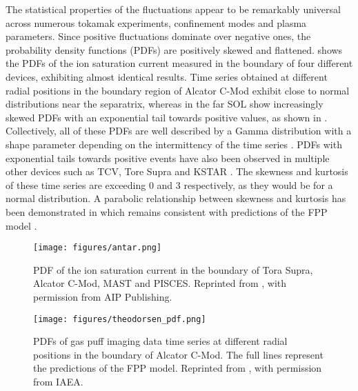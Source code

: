 The statistical properties of the fluctuations appear to be remarkably universal across numerous tokamak experiments, confinement modes and plasma parameters. Since positive fluctuations dominate over negative ones, the probability density functions (PDFs) are positively skewed and flattened.  shows the PDFs of the ion saturation current measured in the boundary of four different devices, exhibiting almost identical results.  Time series obtained at different radial positions in the boundary region of Alcator C-Mod exhibit close to normal distributions near the separatrix, whereas in the far SOL show increasingly skewed PDFs with an exponential tail towards positive values, as shown in . Collectively, all of these PDFs are well described by a Gamma distribution with a shape parameter depending on the intermittency of the time series \cite{theodorsen2017relationship}. PDFs with exponential tails towards positive events have also been observed in multiple other devices such as TCV, Tore Supra and KSTAR \cite{antar2001turbulence,antar2003universality,graves2005self,garcia2007fluctuations,garcia2007collisionality,garcia2009blob,garcia2017sol}. The skewness and kurtosis of these time series are exceeding 0 and 3 respectively, as they would be for a normal distribution. A parabolic relationship between skewness and kurtosis has been demonstrated in  \cite{labit2007universal,sattin2009statistics,sattin2009parabolic} which remains consistent with predictions of the FPP model \cite{garcia2016stochastic}.
\begin{figure}
	\centering
	\begin{minipage}{.48\linewidth}
		\texttt{[image: figures/antar.png]}
		\caption{PDF of the ion saturation current in the boundary of Tora Supra, Alcator C-Mod, MAST and PISCES. Reprinted from \cite{antar2003universality}, with permission from AIP Publishing.}
		\label{Fig:antar}
	\end{minipage}
	\hfill
	\begin{minipage}{.48\linewidth}
		\texttt{[image: figures/theodorsen\_pdf.png]}
		\caption{PDFs of gas puff imaging data time series at different radial positions in the boundary of Alcator C-Mod. The full lines represent the predictions of the FPP model. Reprinted from \cite{theodorsen2017relationship}, with permission from IAEA.}
		\label{Fig:theodorsen_pdf}
	\end{minipage}
\end{figure}

